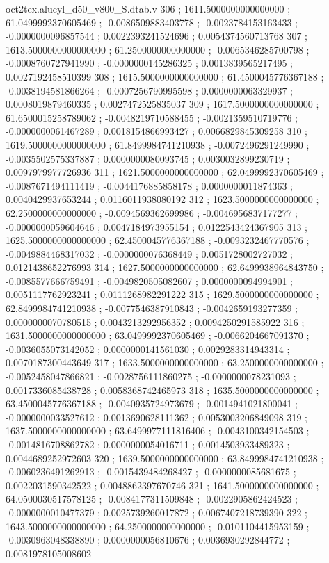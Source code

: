 \begin{filecontents}[overwrite]{oct2tex.alucyl_d50_v800_S.dtab.v}
306 ; 1611.5000000000000000 ; 61.0499992370605469 ; -0.0086509883403778 ; -0.0023784153163433 ; -0.0000000096857544 ; 0.0022393241524696 ; 0.0054374560713768
307 ; 1613.5000000000000000 ; 61.2500000000000000 ; -0.0065346285700798 ; -0.0008760727941990 ; -0.0000000145286325 ; 0.0013839565217495 ; 0.0027192458510399
308 ; 1615.5000000000000000 ; 61.4500045776367188 ; -0.0038194581866264 ; -0.0007256790995598 ; 0.0000000063329937 ; 0.0008019879460335 ; 0.0027472525835037
309 ; 1617.5000000000000000 ; 61.6500015258789062 ; -0.0048219710588455 ; -0.0021359510719776 ; -0.0000000061467289 ; 0.0018154866993427 ; 0.0066829845309258
310 ; 1619.5000000000000000 ; 61.8499984741210938 ; -0.0072496291249990 ; -0.0035502575337887 ; 0.0000000080093745 ; 0.0030032899230719 ; 0.0097979977726936
311 ; 1621.5000000000000000 ; 62.0499992370605469 ; -0.0087671494111419 ; -0.0044176885858178 ; 0.0000000011874363 ; 0.0040429937653244 ; 0.0116011938080192
312 ; 1623.5000000000000000 ; 62.2500000000000000 ; -0.0094569362699986 ; -0.0046956837177277 ; -0.0000000059604646 ; 0.0047184973955154 ; 0.0122543424367905
313 ; 1625.5000000000000000 ; 62.4500045776367188 ; -0.0093232467770576 ; -0.0049884468317032 ; -0.0000000076368449 ; 0.0051728002727032 ; 0.0121438652276993
314 ; 1627.5000000000000000 ; 62.6499938964843750 ; -0.0085577666759491 ; -0.0049820505082607 ; 0.0000000094994901 ; 0.0051117762923241 ; 0.0111268982291222
315 ; 1629.5000000000000000 ; 62.8499984741210938 ; -0.0077546387910843 ; -0.0042659193277359 ; 0.0000000070780515 ; 0.0043213292956352 ; 0.0094250291585922
316 ; 1631.5000000000000000 ; 63.0499992370605469 ; -0.0066204667091370 ; -0.0036055073142052 ; 0.0000000141561030 ; 0.0029283314943314 ; 0.0070187300443649
317 ; 1633.5000000000000000 ; 63.2500000000000000 ; -0.0052458047866821 ; -0.0028756111860275 ; -0.0000000078231093 ; 0.0017336085438728 ; 0.0058368742465973
318 ; 1635.5000000000000000 ; 63.4500045776367188 ; -0.0040935724973679 ; -0.0014941021800041 ; -0.0000000033527612 ; 0.0013690628111362 ; 0.0053003206849098
319 ; 1637.5000000000000000 ; 63.6499977111816406 ; -0.0043100342154503 ; -0.0014816708862782 ; 0.0000000054016711 ; 0.0014503933489323 ; 0.0044689252972603
320 ; 1639.5000000000000000 ; 63.8499984741210938 ; -0.0060236491262913 ; -0.0015439484268427 ; -0.0000000085681675 ; 0.0022031590342522 ; 0.0048862397670746
321 ; 1641.5000000000000000 ; 64.0500030517578125 ; -0.0084177311509848 ; -0.0022905862424523 ; -0.0000000010477379 ; 0.0025739260017872 ; 0.0067407218739390
322 ; 1643.5000000000000000 ; 64.2500000000000000 ; -0.0101104415953159 ; -0.0030963048338890 ; 0.0000000056810676 ; 0.0036930292844772 ; 0.0081978105008602

\end{filecontents}
